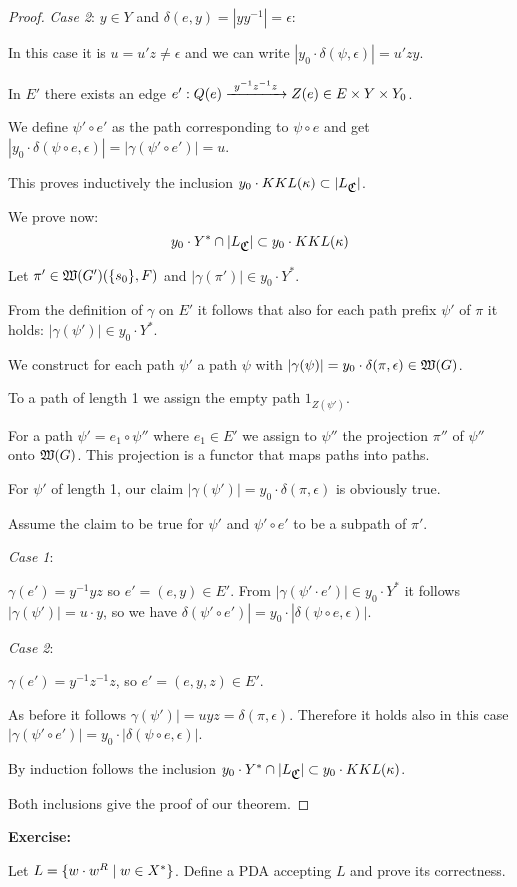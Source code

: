 \begin{proof}
{\em Case 2}: $y \in Y$ and $\delta(e, y) = |y y^{-1}| = \epsilon$:

In this case it is $u = u' z \neq \epsilon$ and we can write $|y_0 \cdot
\delta(\psi, \epsilon)| = u'zy$.

In $E'$ there exists an edge $e' : Q(e) \xrightarrow{\ {y^{-1}z^{-1}z}\ } Z(e) \in E
\times Y \times Y_0$.

We define $\psi' \circ e'$ as the path corresponding to $\psi \circ e$ and get
$|y_0 \cdot \delta(\psi \circ e, \epsilon)| = |\gamma(\psi' \circ e')| = u$.

This proves inductively the inclusion $y_0 \cdot KKL(\kappa) \subset
|L_{\mbox{$\mathfrak{C}$}}|$.


We prove now:
\[ y_0 \cdot Y^* \cap |L_{\mbox{$\mathfrak{C}$}}| \subset y_0 \cdot KKL(\kappa) \]

Let $\pi' \in \mbox{$\mathfrak{W}(G')$}(\mbox{$\{s_0\}$}, F)$ and $|\gamma(\pi')| \in y_0 \cdot
Y^*$.

From the definition of $\gamma$ on $E'$ it follows that also for each path
prefix $\psi'$ of $\pi$ it holds: $|\gamma(\psi')| \in y_0 \cdot Y^*$.

We construct for each path $\psi'$ a path $\psi$ with $|\gamma(\psi)| = y_0
\cdot \delta(\pi, \epsilon) \in \mbox{$\mathfrak{W}(G)$}$.

To a path of length 1 we assign the empty path $1_{Z(\psi')}$.

For a path $\psi' = e_1 \circ \psi''$ where $e_1 \in E'$ we assign to $\psi''$
the projection $\pi''$ of $\psi''$ onto $\mbox{$\mathfrak{W}(G)$}$. This projection is a
functor that maps paths into paths.

For $\psi'$ of length 1, our claim $|\gamma(\psi')| = y_0 \cdot \delta(\pi,
\epsilon)$ is obviously true.

Assume the claim to be true for $\psi'$ and $\psi' \circ e'$ to be a subpath of
$\pi'$.

{\em Case 1}:

$\gamma(e') = y^{-1}yz$ so $e' = (e, y) \in E'$. From $|\gamma(\psi' \cdot
e')| \in y_0 \cdot Y^*$ it follows $|\gamma(\psi')| = u \cdot y$, so we have
$\delta(\psi' \circ e')| = y_0 \cdot |\delta(\psi \circ e, \epsilon)|$.

{\em Case 2}:

$\gamma(e') = y^{-1} z^{-1} z$, so $e' = (e, y, z) \in E'$.

As before it follows $\gamma(\psi')| = uyz = \delta(\pi, \epsilon)$. Therefore
it holds also in this case $|\gamma(\psi' \circ e')| = y_0 \cdot |\delta(\psi
\circ e, \epsilon)|$.

By induction follows the inclusion $y_0 \cdot Y^* \cap |L_{\mbox{$\mathfrak{C}$}}| \subset y_0
\cdot KKL(\kappa)$.

Both inclusions give the proof of our theorem.
\end{proof}

{\bf Exercise:}

Let $L = \mbox{$\{ w \cdot w^R \mid w \in X^*\}$}$. Define a PDA accepting $L$ and
prove its correctness.
